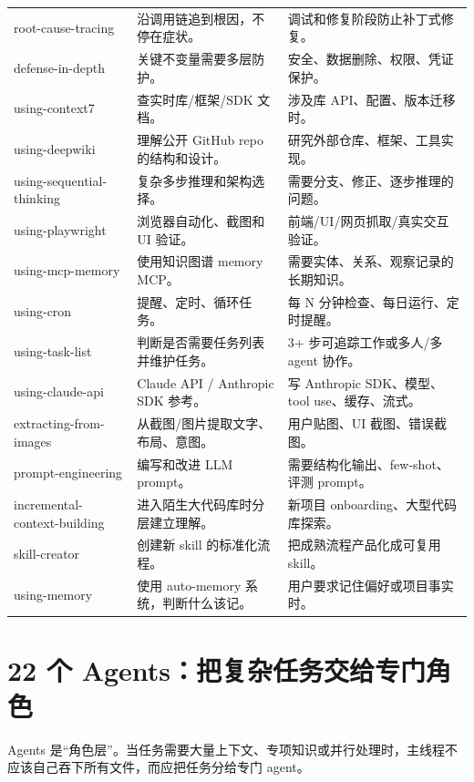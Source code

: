 \documentclass[11pt,a4paper]{ctexbook}
\begin{document}
\begin{longtable}{p{}p{}p{}}
root-cause-tracing & 沿调用链追到根因，不停在症状。 & 调试和修复阶段防止补丁式修复。 \\
defense-in-depth & 关键不变量需要多层防护。 & 安全、数据删除、权限、凭证保护。 \\
using-context7 & 查实时库/框架/SDK 文档。 & 涉及库 API、配置、版本迁移时。 \\
using-deepwiki & 理解公开 GitHub repo 的结构和设计。 & 研究外部仓库、框架、工具实现。 \\
using-sequential-thinking & 复杂多步推理和架构选择。 & 需要分支、修正、逐步推理的问题。 \\
using-playwright & 浏览器自动化、截图和 UI 验证。 & 前端/UI/网页抓取/真实交互验证。 \\
using-mcp-memory & 使用知识图谱 memory MCP。 & 需要实体、关系、观察记录的长期知识。 \\
using-cron & 提醒、定时、循环任务。 & 每 N 分钟检查、每日运行、定时提醒。 \\
using-task-list & 判断是否需要任务列表并维护任务。 & 3+ 步可追踪工作或多人/多 agent 协作。 \\
using-claude-api & Claude API / Anthropic SDK 参考。 & 写 Anthropic SDK、模型、tool use、缓存、流式。 \\
extracting-from-images & 从截图/图片提取文字、布局、意图。 & 用户贴图、UI 截图、错误截图。 \\
prompt-engineering & 编写和改进 LLM prompt。 & 需要结构化输出、few-shot、评测 prompt。 \\
incremental-context-building & 进入陌生大代码库时分层建立理解。 & 新项目 onboarding、大型代码库探索。 \\
skill-creator & 创建新 skill 的标准化流程。 & 把成熟流程产品化成可复用 skill。 \\
using-memory & 使用 auto-memory 系统，判断什么该记。 & 用户要求记住偏好或项目事实时。 \\
\bottomrule
\end{longtable}

\section{22 个 Agents：把复杂任务交给专门角色}

Agents 是“角色层”。当任务需要大量上下文、专项知识或并行处理时，主线程不应该自己吞下所有文件，而应把任务分给专门 agent。
\end{document}
